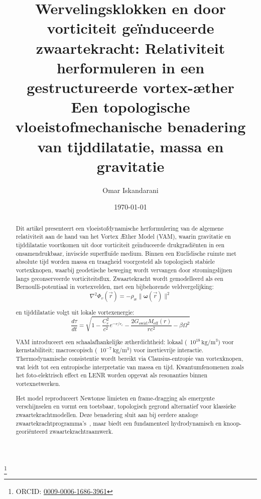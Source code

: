 \documentclass[a4paper, aps,preprint,superscriptaddress, 12pt]{revtex4}
\begin{document}
\author{Omar Iskandarani}
\title{
    Wervelingsklokken en door vorticiteit geïnduceerde zwaartekracht:
    Relativiteit herformuleren in een gestructureerde vortex-æther\\
    \textnormal{\normalsize Een topologische vloeistofmechanische benadering van tijddilatatie, massa en gravitatie}
}

\date{\today}
\thanks{ORCID: \href{https://orcid.org/0009-0006-1686-3961}{0009-0006-1686-3961}}



\begin{abstract}
Dit artikel presenteert een vloeistofdynamische herformulering van de algemene relativiteit aan de hand van het Vortex Æther Model (VAM), waarin gravitatie en tijddilatatie voortkomen uit door vorticiteit geïnduceerde drukgradiënten in een onsamendrukbaar, inviscide superfluïde medium. Binnen een Euclidische ruimte met absolute tijd worden massa en traagheid voorgesteld als topologisch stabiele vortexknopen, waarbij geodetische beweging wordt vervangen door stromingslijnen langs geconserveerde vorticiteitsflux.
Zwaartekracht wordt gemodelleerd als een Bernoulli-potentiaal in vortexvelden, met een bijbehorende veldvergelijking:
\begin{equation*}
    \nabla^2 \Phi_v(\vec{r}) = -\rho_\text{\ae} \|\boldsymbol{\omega}(\vec{r})\|^2
\end{equation*}

en tijddilatatie volgt uit lokale vortexenergie:
\begin{equation*}
    \frac{d\tau}{dt} = \sqrt{1 - \frac{C_e^2}{c^2} e^{-r/r_c} - \frac{2G_\text{swirl} M_\text{eff}(r)}{rc^2} - \beta \Omega^2}
\end{equation*}

VAM introduceert een schaalafhankelijke ætherdichtheid: lokaal (~$10^{18}\,\mathrm{kg/m^3}$) voor kernstabiliteit; macroscopisch (~$10^{-7}\,\mathrm{kg/m^3}$) voor inertievrije interactie. Thermodynamische consistentie wordt bereikt via Clausius-entropie van vortexknopen, wat leidt tot een entropische interpretatie van massa en tijd. Kwantumfenomenen zoals het foto-elektrisch effect en LENR worden opgevat als resonanties binnen vortexnetwerken.

Het model reproduceert Newtonse limieten en frame-dragging als emergente verschijnselen en vormt een toetsbaar, topologisch gegrond alternatief voor klassieke zwaartekrachtmodellen. Deze benadering sluit aan bij eerdere analoge zwaartekrachtprogramma’s~\cite{barcelo2011analogue,volovik2009universe}, maar biedt een fundamenteel hydrodynamisch en knoop-georiënteerd zwaartekrachtraamwerk.
\end{abstract}
\end{document}

